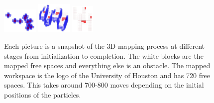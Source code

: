 \documentclass[letterpaper, 9 pt, conference]{ieeeconf}  %
\begin{document}
\begin{figure}

	\includegraphics[width=0.15\textwidth]{3D_initial}
	\includegraphics[width=0.15\textwidth]{3D_middle}
	\includegraphics[width=0.1\textwidth]{3D_final}
	\caption{Each picture is a snapshot of the 3D mapping process at different stages from initialization to completion. The white blocks are the mapped free spaces and everything else is an obstacle. The mapped workspace is the logo of the University of Houston and has 720 free spaces. This takes around 700-800 moves depending on the initial positions of the particles.}

\end{figure}
\end{document}
